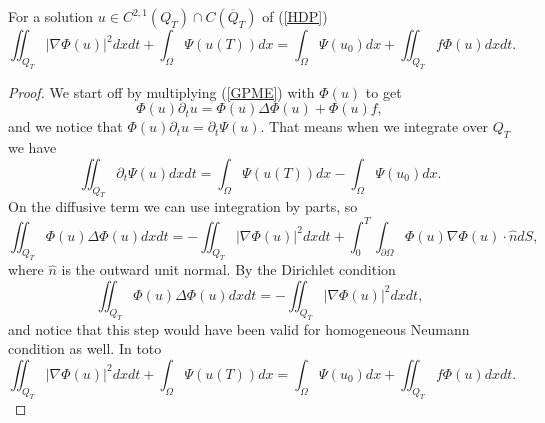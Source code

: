 \documentclass[11pt, a4paper]{article}
\begin{document}
\begin{lemma}
For a solution $u\in C^{2,1}(Q_T) \cap C(\overline{Q}_T)$ of (\ref{HDP})
\begin{equation}
\label{spatial_derivative_bound}
\iint_{Q_T} |\nabla \Phi(u)|^2dxdt + \int_\Omega \Psi(u(T))dx = \int_\Omega \Psi(u_0)dx + \iint_{Q_T} f\Phi(u)dxdt.
\end{equation}
\end{lemma}

\begin{proof}
We start off by multiplying (\ref{GPME}) with $\Phi(u)$ to get
\begin{equation*}
\Phi(u)\partial_t u = \Phi(u)\Delta \Phi(u) + \Phi(u)f,
\end{equation*}
and we notice that $\Phi(u)\partial_t u = \partial_t \Psi(u)$. That means when we integrate over $Q_T$ we have
\begin{equation*}
\iint_{Q_T} \partial_t \Psi(u)dxdt = \int_\Omega \Psi(u(T))dx - \int_\Omega \Psi(u_0)dx.
\end{equation*}
On the diffusive term we can use integration by parts, so
\begin{equation*}
\iint_{Q_T}\Phi(u) \Delta \Phi(u) dxdt = -\iint_{Q_T} |\nabla \Phi(u)|^2dxdt + \int_0^T \int_{\partial\Omega} \Phi(u)\nabla \Phi(u) \cdot \hat{n}dS,
\end{equation*}
where $\hat{n}$ is the outward unit normal. By the Dirichlet condition
\begin{equation*}
\iint_{Q_T}\Phi(u) \Delta \Phi(u) dxdt = -\iint_{Q_T} |\nabla \Phi(u)|^2dxdt,
\end{equation*}
and notice that this step would have been valid for homogeneous Neumann condition as well. In toto 
\begin{equation*}
\iint_{Q_T} |\nabla \Phi(u)|^2dxdt + \int_\Omega \Psi(u(T))dx = \int_\Omega \Psi(u_0)dx + \iint_{Q_T} f\Phi(u)dxdt.
\end{equation*}
\end{proof}
\setcounter{obs}{0}
\end{document}
